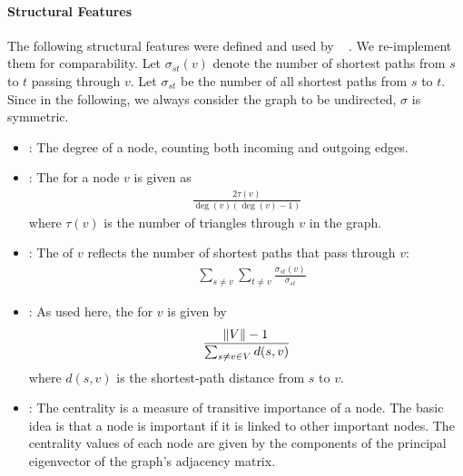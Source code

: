 \documentclass[
	fontsize=10pt, %
	twoside=true, %
	secnumdepth=1, %
  toc=indentunnumbered %
]{kaobook}
\begin{document}
\paragraph{Structural Features} The following structural features were defined
and used by \citeauthor{nielsen_MachineLearningSupport_2019}~\cite{nielsen_MachineLearningSupport_2019}
. We re-implement
them for comparability. Let $\sigma_{st}(v)$ denote the number of shortest paths
from $s$ to $t$ passing through $v$. Let $\sigma_{st}$ be the number of all shortest
paths from $s$ to $t$. Since in the following, we always consider the graph to
be undirected, $\sigma$ is symmetric.

\begin{itemize}
\item {}: The degree of a node, counting both incoming and
  outgoing edges.
\item {}: The 
  \cite{brandes_NetworkAnalysisMethodological_2005}
  for a
  node $v$ is given as
  \begin{align*}
    \frac{2 \tau(v)}{\deg(v)(\deg(v)-1)}
  \end{align*}
  where $\tau(v)$ is the number of triangles through $v$ in the graph.
\item {}: The  of $v$
  reflects the number of shortest paths that pass through $v$:
  \begin{align*}
    & \sum_{s \not= v} \sum_{t \not= v} \frac{\sigma_{st}(v)}{\sigma_{st}}
  \end{align*}
\item {}: As used here, the  for $v$ is given by
  \begin{align*}
    \frac{\norm{V}-1}{\sum_{s \not= v \in V} d(s,v)}
  \end{align*}
  where $d(s,v)$ is the shortest-path distance from $s$ to $v$.
\item {}: The  centrality is a
  measure of transitive importance of a node. The basic idea is that a node is
  important if it is linked to other important nodes. The centrality values of
  each node are given by the components of the principal eigenvector of the graph's
  adjacency matrix.
\end{itemize}
\end{document}
